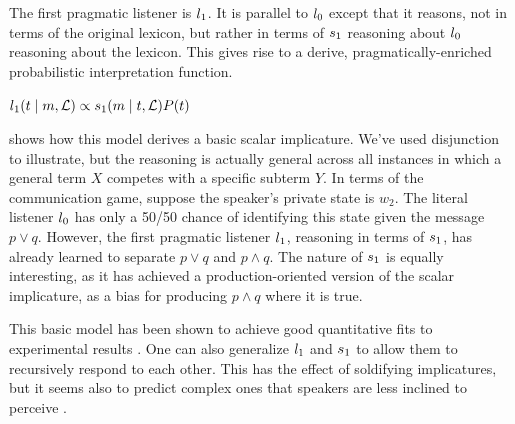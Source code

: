 \documentclass{article}
\begin{document}
The first pragmatic listener is $l_{1}$. It is parallel to
$l_{0}$ except that it reasons, not in terms of the original
lexicon, but rather in terms of $s_{1}$ reasoning about
$l_{0}$ reasoning about the lexicon. This gives rise to a
derive, pragmatically-enriched probabilistic interpretation function.
%
\begin{examples}
\item\label{l1}%
  $l_{1}(t \mid m, \mathcal{L}) \propto 
  s_{1}(m \mid t, \mathcal{L})
  P(t)$
\end{examples}

\newcommand{\porq}{p \vee q}
\newcommand{\pandq}{p \wedge q}

 shows how this model derives a basic scalar
implicature. We've used disjunction to illustrate, but the reasoning
is actually general across all instances in which a general term $X$
competes with a specific subterm $Y$. In terms of the communication
game, suppose the speaker's private state is $w_{2}$. The literal
listener $l_{0}$ has only a 50/50 chance of identifying this
state given the message $\porq$.  However, the first pragmatic
listener $l_{1}$, reasoning in terms of $s_{1}$, has
already learned to separate $\porq$ and $\pandq$. The nature of
$s_{1}$ is equally interesting, as it has achieved a
production-oriented version of the scalar implicature, as a bias for
producing $\pandq$ where it is true.

This basic model has been shown to achieve good quantitative fits to
experimental results
\citep{Degen:Franke:2012,Stiller:Goodman:Frank:2011}. One can also
generalize $l_{1}$ and $s_{1}$ to allow them to
recursively respond to each other. This has the effect of soldifying
implicatures, but it seems also to predict complex ones that speakers
are less inclined to perceive \citep{Vogel-etal:2014}.
\end{document}
